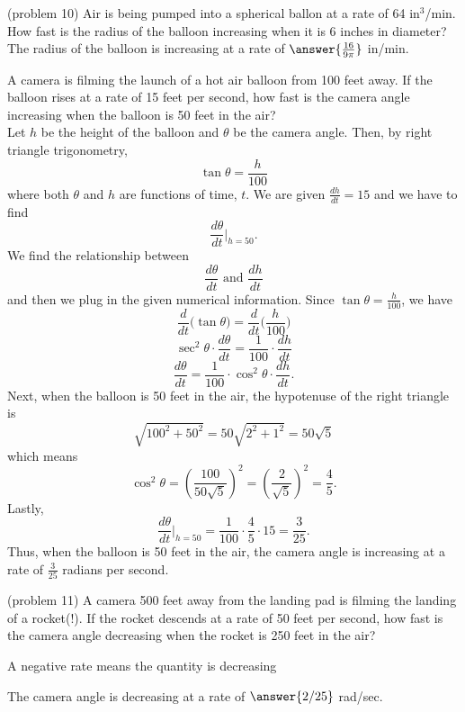 \documentclass{ximera}
\begin{document}
\begin{problem}(problem 10)
Air is being pumped into a spherical ballon at a rate of 64 in$^3$/min. How fast is the radius of the balloon
increasing when it is 6 inches in diameter?\\


The radius of the balloon is increasing at a rate of $\answer{\frac{16}{9\pi}}$ in/min.
\end{problem}



\begin{example}[example 11]
A camera is filming the launch of a hot air balloon from 100 feet away. 
If the balloon rises at a rate of 15 feet per second, how fast is the camera angle increasing when the balloon is 50 feet in the air?\\
Let $h$ be the height of the balloon and $\theta$ be the camera angle. Then, by right triangle trigonometry, 
\[\tan \theta  = \frac{h}{100}\]
where both $\theta$ and $h$ are functions of time, $t$.
We are given $\frac{dh}{dt} = 15$ and we have to find
\[\frac{d\theta}{dt}\bigg|_{h = 50}.\]
We find the relationship between 
\[\frac{d\theta}{dt} \text{ and } \frac{dh}{dt}\]
and then we plug in the given numerical information.
Since $\tan\theta = \frac{h}{100}$, we have
\[\frac{d}{dt}\big(\tan\theta\big) = \frac{d}{dt} \Big(\frac{h}{100}\Big)\]
 \[\sec^2 \theta \cdot \frac{d\theta}{dt} = \frac{1}{100} \cdot \frac{dh}{dt}\]
\[ \frac{d\theta}{dt} = \frac{1}{100}\cdot\cos^2 \theta  \cdot\frac{dh}{dt}.\]
Next, when the balloon is 50 feet in the air, the hypotenuse of the right triangle is 
\[\sqrt{100^2 + 50^2} = 50\sqrt{2^2 + 1^2} = 50\sqrt 5\]
which means 
\[\cos^2 \theta = \left(\frac{100}{50\sqrt 5}\right)^2 = \left(\frac{2}{\sqrt 5}\right)^2 = \frac45.\]
Lastly,
\[\frac{d\theta}{dt}\bigg|_{h = 50}= \frac{1}{100} \cdot \frac45 \cdot 15 = \frac{3}{25}.\]
Thus, when the balloon is 50 feet in the air, the camera angle is increasing at a rate of $\frac{3}{25}$ radians per second.
\end{example}


\begin{problem}(problem 11)
A camera 500 feet away from the landing pad is filming the landing of a rocket(!).
If the rocket descends at a rate of 50 feet per second, how fast is the camera angle decreasing when the 
rocket is 250 feet in the air?\\

\begin{hint} 
A negative rate means the quantity is decreasing
\end{hint}

The camera angle is decreasing at a rate of $\answer{2/25}$ rad/sec.

\end{problem}
\end{document}
